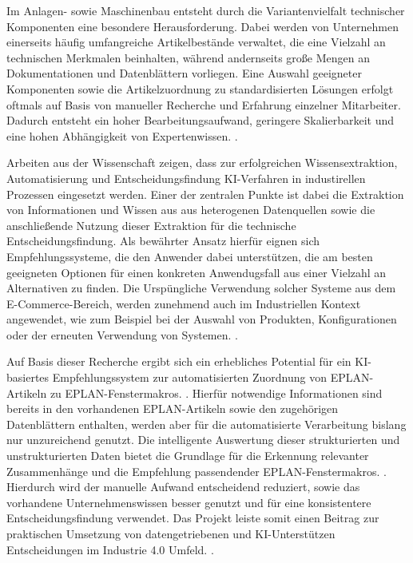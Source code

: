 \documentclass[12pt,a4paper%
              ,oneside     %
              ,titlepage
              ,DIV=13
              ,headinclude
              ,footinclude=false%
              ,cleardoublepage=empty%
              ,parskip=half,
              BCOR=0mm,
              ]{scrreprt}
\begin{document}
Im Anlagen- sowie Maschinenbau entsteht durch die Variantenvielfalt technischer Komponenten eine besondere Herausforderung.
Dabei werden von Unternehmen einerseits häufig umfangreiche Artikelbestände verwaltet, die eine Vielzahl an technischen Merkmalen beinhalten,
während andernseits große Mengen an Dokumentationen und Datenblättern vorliegen.
Eine Auswahl geeigneter Komponenten sowie die Artikelzuordnung zu standardisierten Lösungen erfolgt oftmals auf Basis von manueller Recherche und Erfahrung einzelner Mitarbeiter.
Dadurch entsteht ein hoher Bearbeitungsaufwand, geringere Skalierbarkeit und eine hohen Abhängigkeit von Expertenwissen. \cite{Pfenning2022}.


Arbeiten aus der Wissenschaft zeigen, dass zur erfolgreichen Wissensextraktion, Automatisierung und Entscheidungsfindung KI-Verfahren in industirellen Prozessen eingesetzt werden.
Einer der zentralen Punkte ist dabei die Extraktion von Informationen und Wissen aus aus heterogenen Datenquellen sowie die anschließende Nutzung dieser Extraktion für die technische Entscheidungsfindung.
Als bewährter Ansatz hierfür eignen sich Empfehlungssysteme, die den Anwender dabei unterstützen, die am besten geeigneten Optionen für einen konkreten Anwendugsfall aus einer Vielzahl an Alternativen zu finden.
Die Urspüngliche Verwendung solcher Systeme aus dem E-Commerce-Bereich, werden zunehmend auch im Industriellen Kontext angewendet, wie zum Beispiel bei der Auswahl von Produkten, Konfigurationen oder der erneuten Verwendung von Systemen. \cite{Joshi2024}.

Auf Basis dieser Recherche ergibt sich ein erhebliches Potential für ein KI-basiertes Empfehlungssystem zur automatisierten Zuordnung von EPLAN-Artikeln \cite{EPLANArtikelverwaltung} zu EPLAN-Fenstermakros. \cite{EPLAN2025}.
Hierfür notwendige Informationen sind bereits in den vorhandenen EPLAN-Artikeln \cite{EPLANArtikelverwaltung} sowie den zugehörigen Datenblättern enthalten, werden aber für die automatisierte Verarbeitung bislang nur unzureichend genutzt. 
Die intelligente Auswertung dieser strukturierten und unstrukturierten Daten bietet die Grundlage für die Erkennung relevanter Zusammenhänge und die Empfehlung passendender EPLAN-Fenstermakros. \cite{EPLAN2025}.
Hierdurch wird der manuelle Aufwand entscheidend reduziert, sowie das vorhandene Unternehmenswissen besser genutzt und für eine konsistentere Entscheidungsfindung verwendet.
Das Projekt leiste somit einen Beitrag zur praktischen Umsetzung von datengetriebenen und KI-Unterstützen Entscheidungen im Industrie 4.0 Umfeld. \cite{Nayak2025}.
\end{document}
